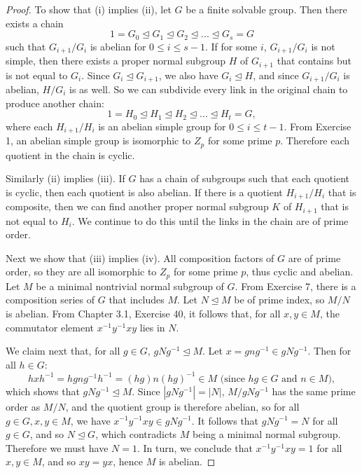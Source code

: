 \documentclass{article}
\begin{document}
\begin{proof}

To show that (i) implies (ii), let $G$ be a finite solvable group. Then there exists a chain
\begin{equation*}
    1 = G_0 \unlhd G_1 \unlhd G_2 \unlhd ... \unlhd G_s = G
\end{equation*}
such that $G_{i + 1}/G_i$ is abelian for $0 \leq i \leq s - 1$. If for some $i$, $G_{i + 1}/G_i$ is not simple, then there exists a proper normal subgroup $H$ of $G_{i + 1}$ that contains but is not equal to $G_i$. Since $G_i \unlhd G_{i + 1}$, we also have $G_i \unlhd H$, and since $G_{i + 1}/G_i$ is abelian, $H/G_i$ is as well. So we can subdivide every link in the original chain to produce another chain:
\begin{equation*}
    1 = H_0 \unlhd H_1 \unlhd H_2 \unlhd ... \unlhd H_t = G,
\end{equation*}
where each $H_{i + 1}/H_i$ is an abelian simple group for $0 \leq i \leq t - 1$. From Exercise 1, an abelian simple group is isomorphic to $Z_p$ for some prime $p$. Therefore each quotient in the chain is cyclic.

Similarly (ii) implies (iii). If $G$ has a chain of subgroups such that each quotient is cyclic, then each quotient is also abelian. If there is a quotient $H_{i + 1}/H_i$ that is composite, then we can find another proper normal subgroup $K$ of $H_{i + 1}$ that is not equal to $H_i$. We continue to do this until the links in the chain are of prime order.

Next we show that (iii) implies (iv). All composition factors of $G$ are of prime order, so they are all isomorphic to $Z_p$ for some prime $p$, thus cyclic and abelian. Let $M$ be a minimal nontrivial normal subgroup of $G$. From Exercise 7, there is a composition series of $G$ that includes $M$. Let $N \unlhd M$ be of prime index, so $M/N$ is abelian. From Chapter 3.1, Exercise 40, it follows that, for all $x, y \in M$, the commutator element $x^{-1}y^{-1}xy$ lies in $N$. 

We claim next that, for all $g \in G$, $gNg^{-1} \unlhd M$. Let $x = gng^{-1} \in gNg^{-1}$. Then for all $h \in G$:
\begin{equation*}
    hxh^{-1} = hgng^{-1}h^{-1} = (hg)n(hg)^{-1} \in M \text{ (since $hg \in G$ and $n \in M$)},
\end{equation*}
which shows that $gNg^{-1} \unlhd M$. Since $|gNg^{-1}| = |N|$, $M/gNg^{-1}$ has the same prime order as $M/N$, and the quotient group is therefore abelian, so for all $g \in G, x, y \in M$, we have $x^{-1}y^{-1}xy \in gNg^{-1}$. It follows that $gNg^{-1} = N$ for all $g \in G$, and so $N \unlhd G$, which contradicts $M$ being a minimal normal subgroup. Therefore we must have $N = 1$. In turn, we conclude that $x^{-1}y^{-1}xy = 1$ for all $x, y \in M$, and so $xy = yx$, hence $M$ is abelian.


\end{proof}
\end{document}
